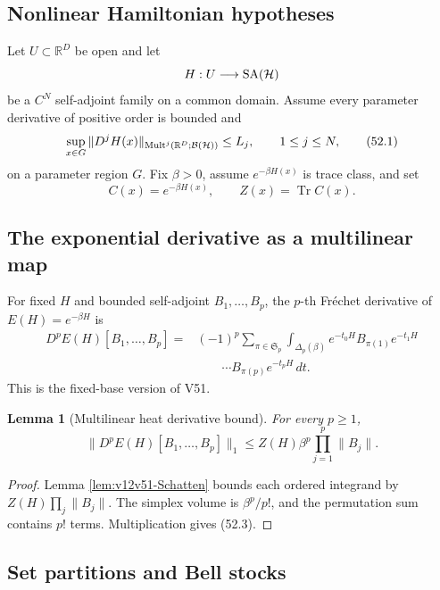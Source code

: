 \documentclass[11pt]{article}
\newtheorem{lemma}[theorem]{Lemma}
\theoremstyle{remark}
\begin{document}
\subsection{Nonlinear Hamiltonian hypotheses}

Let \(U\subset\mathbb R^D\) be open and let
\[
 H:U\longrightarrow{\rm SA}({\cal H})
\]
be a \(C^N\) self-adjoint family on a common domain.  Assume every
parameter derivative of positive order is bounded and
\begin{equation}
 \sup_{x\in G}
 \|D^jH(x)\|_{\operatorname{Mult}^j
  (\mathbb R^D;{\cal B}({\cal H}))}
 \leq L_j,
 \qquad1\leq j\leq N,                            \tag{52.1}
\end{equation}
on a parameter region \(G\).  Fix \(\beta>0\), assume
\(e^{-\beta H(x)}\) is trace class, and set
\[
 C(x)=e^{-\beta H(x)},\qquad
 Z(x)=\operatorname{Tr}C(x).
\]

\subsection{The exponential derivative as a multilinear map}

For fixed \(H\) and bounded self-adjoint
\(B_1,\ldots,B_p\), the \(p\)-th Fr\'echet derivative of
\(E(H)=e^{-\beta H}\) is
\begin{align}
 D^pE(H)[B_1,\ldots,B_p]
 ={}&(-1)^p
 \sum_{\pi\in{\mathfrak S}_p}
 \int_{\Delta_p(\beta)}
 e^{-t_0H}B_{\pi(1)}e^{-t_1H}
 \nonumber\\
 &\qquad\cdots
 B_{\pi(p)}e^{-t_pH}\,dt.                        \tag{52.2}
\end{align}
This is the fixed-base version of V51.

\begin{lemma}[Multilinear heat derivative bound]
\label{lem:v12v52-exponential}
For every \(p\geq1\),
\begin{equation}
 \|D^pE(H)[B_1,\ldots,B_p]\|_1
 \leq
 Z(H)\beta^p\prod_{j=1}^p\|B_j\|.                \tag{52.3}
\end{equation}
\end{lemma}

\begin{proof}
Lemma \ref{lem:v12v51-Schatten} bounds each ordered integrand by
\(Z(H)\prod_j\|B_j\|\).  The simplex volume is
\(\beta^p/p!\), and the permutation sum contains \(p!\) terms.
Multiplication gives (52.3).
\end{proof}

\subsection{Set partitions and Bell stocks}
\end{document}
